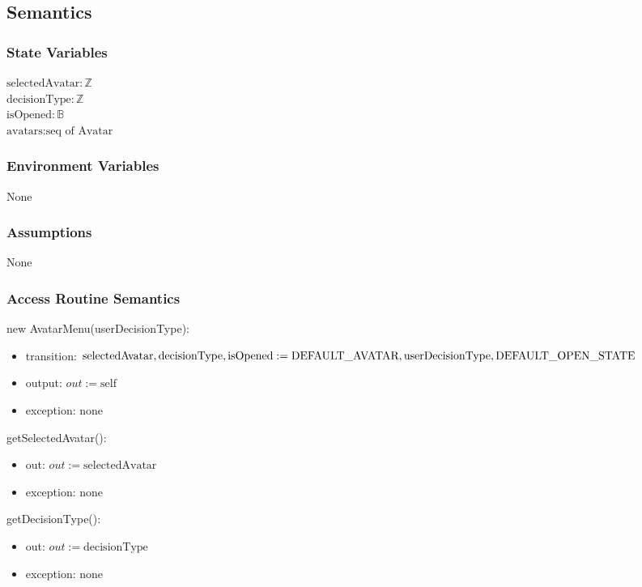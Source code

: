 \documentclass[12pt, titlepage]{article}
\begin{document}
\subsection{Semantics}

\subsubsection{State Variables}
$\text{selectedAvatar}: \text{$\mathbb{Z}$}$\\
$\text{decisionType}: \text{$\mathbb{Z}$}$\\
$\text{isOpened}: \text{$\mathbb{B}$}$\\
$\text{avatars}: \text{seq of Avatar}$\\
\subsubsection{Environment Variables}
None

\subsubsection{Assumptions}
None

\subsubsection{Access Routine Semantics}

\noindent new AvatarMenu(userDecisionType):
\begin{itemize}
\item transition: $\text{selectedAvatar}, \text{decisionType}, \text{isOpened}:= \text{DEFAULT\_AVATAR}, \newline \text{userDecisionType}, \text{DEFAULT\_OPEN\_STATE}$
\item output: $out := \mbox{self}$
\item exception: none
\end{itemize}


\noindent getSelectedAvatar():
\begin{itemize}
\item out: $out := \text{selectedAvatar}$
\item exception: none
\end{itemize}

\noindent getDecisionType():
\begin{itemize}
\item out: $out := \text{decisionType}$
\item exception: none
\end{itemize}
\end{document}

